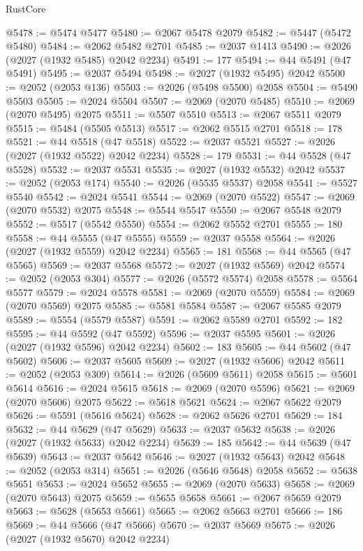 \begin{lexlean}{RustCore}
\begin{coremodule}
@5478 := @5474 @5477
@5480 := @2067 @5478 @2079
@5482 := @5447 (@5472 @5480)
@5484 := @2062 @5482 @2701
@5485 := @2037 @1413
@5490 := @2026 (@2027 (@1932 @5485) @2042 @2234)
@5491 := 177
@5494 := @44 @5491 (@47 @5491)
@5495 := @2037 @5494
@5498 := @2027 (@1932 @5495) @2042
@5500 := @2052 (@2053 @136)
@5503 := @2026 (@5498 @5500) @2058
@5504 := @5490 @5503
@5505 := @2024 @5504
@5507 := @2069 (@2070 @5485)
@5510 := @2069 (@2070 @5495) @2075
@5511 := @5507 @5510
@5513 := @2067 @5511 @2079
@5515 := @5484 (@5505 @5513)
@5517 := @2062 @5515 @2701
@5518 := 178
@5521 := @44 @5518 (@47 @5518)
@5522 := @2037 @5521
@5527 := @2026 (@2027 (@1932 @5522) @2042 @2234)
@5528 := 179
@5531 := @44 @5528 (@47 @5528)
@5532 := @2037 @5531
@5535 := @2027 (@1932 @5532) @2042
@5537 := @2052 (@2053 @174)
@5540 := @2026 (@5535 @5537) @2058
@5541 := @5527 @5540
@5542 := @2024 @5541
@5544 := @2069 (@2070 @5522)
@5547 := @2069 (@2070 @5532) @2075
@5548 := @5544 @5547
@5550 := @2067 @5548 @2079
@5552 := @5517 (@5542 @5550)
@5554 := @2062 @5552 @2701
@5555 := 180
@5558 := @44 @5555 (@47 @5555)
@5559 := @2037 @5558
@5564 := @2026 (@2027 (@1932 @5559) @2042 @2234)
@5565 := 181
@5568 := @44 @5565 (@47 @5565)
@5569 := @2037 @5568
@5572 := @2027 (@1932 @5569) @2042
@5574 := @2052 (@2053 @304)
@5577 := @2026 (@5572 @5574) @2058
@5578 := @5564 @5577
@5579 := @2024 @5578
@5581 := @2069 (@2070 @5559)
@5584 := @2069 (@2070 @5569) @2075
@5585 := @5581 @5584
@5587 := @2067 @5585 @2079
@5589 := @5554 (@5579 @5587)
@5591 := @2062 @5589 @2701
@5592 := 182
@5595 := @44 @5592 (@47 @5592)
@5596 := @2037 @5595
@5601 := @2026 (@2027 (@1932 @5596) @2042 @2234)
@5602 := 183
@5605 := @44 @5602 (@47 @5602)
@5606 := @2037 @5605
@5609 := @2027 (@1932 @5606) @2042
@5611 := @2052 (@2053 @309)
@5614 := @2026 (@5609 @5611) @2058
@5615 := @5601 @5614
@5616 := @2024 @5615
@5618 := @2069 (@2070 @5596)
@5621 := @2069 (@2070 @5606) @2075
@5622 := @5618 @5621
@5624 := @2067 @5622 @2079
@5626 := @5591 (@5616 @5624)
@5628 := @2062 @5626 @2701
@5629 := 184
@5632 := @44 @5629 (@47 @5629)
@5633 := @2037 @5632
@5638 := @2026 (@2027 (@1932 @5633) @2042 @2234)
@5639 := 185
@5642 := @44 @5639 (@47 @5639)
@5643 := @2037 @5642
@5646 := @2027 (@1932 @5643) @2042
@5648 := @2052 (@2053 @314)
@5651 := @2026 (@5646 @5648) @2058
@5652 := @5638 @5651
@5653 := @2024 @5652
@5655 := @2069 (@2070 @5633)
@5658 := @2069 (@2070 @5643) @2075
@5659 := @5655 @5658
@5661 := @2067 @5659 @2079
@5663 := @5628 (@5653 @5661)
@5665 := @2062 @5663 @2701
@5666 := 186
@5669 := @44 @5666 (@47 @5666)
@5670 := @2037 @5669
@5675 := @2026 (@2027 (@1932 @5670) @2042 @2234)

\end{coremodule}
\end{lexlean}
